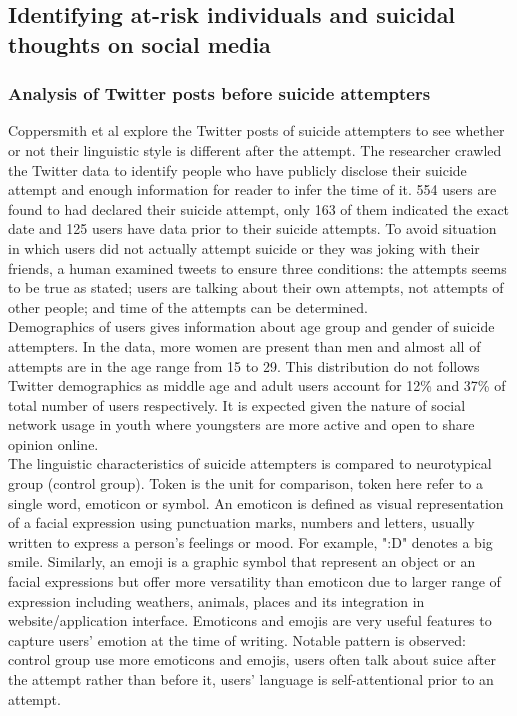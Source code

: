 \subsection{Identifying at-risk individuals and suicidal thoughts on social media}
\subsubsection*{Analysis of Twitter posts before suicide attempters}
Coppersmith et al \cite{Coppersmith2016} explore the Twitter posts of suicide attempters to see whether or not their linguistic style is different after the attempt. The researcher crawled the Twitter data to identify people who have publicly disclose their suicide attempt and enough information for reader to infer the time of it. 554 users are found to had declared their suicide attempt, only 163 of them indicated the exact date and 125 users have data prior to their suicide attempts. To avoid situation in which users did not actually attempt suicide or they was joking with their friends, a human examined tweets to ensure three conditions: the attempts seems to be true as stated; users are talking about their own attempts, not attempts of other people; and time of the attempts can be determined.\\
Demographics of users gives information about age group and gender of suicide attempters. In the data, more women are present than men and almost all of attempts are in the age range from 15 to 29. This distribution do not follows Twitter demographics as middle age and adult users account for 12\% and 37\% of total number of users respectively. It is expected given the nature of social network usage in youth where youngsters are more active and open to share opinion online.\\
The linguistic characteristics of suicide attempters is compared to neurotypical group (control group). Token is the unit for comparison, token here refer to a single word, emoticon or symbol. An emoticon is defined as visual representation of a facial expression using punctuation marks, numbers and letters, usually written to express a person's feelings or mood. For example, ":D" denotes a big smile. Similarly, an emoji is a graphic symbol that represent an object or an facial expressions but offer more versatility than emoticon due to larger range of expression including weathers, animals, places and its integration in website/application interface. Emoticons and emojis are very useful features to capture users' emotion at the time of writing. Notable pattern is observed: control group use more emoticons and emojis, users often talk about suice after the attempt rather than before it, users' language is self-attentional prior to an attempt.\\
